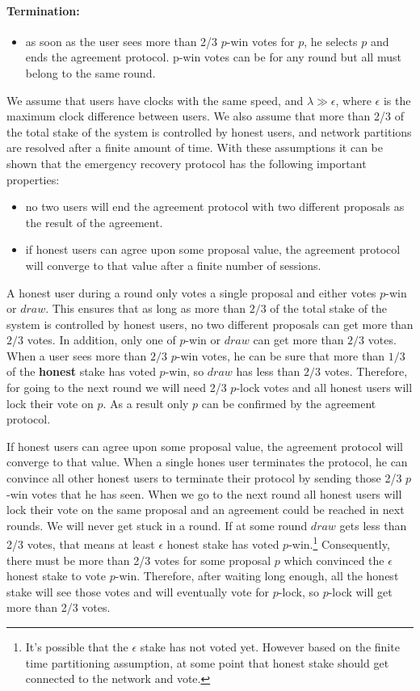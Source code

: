 \paragraph{Termination:}
\begin{itemize}
    \item as soon as the user sees more than 2/3 $p$-win votes for $p$, he selects $p$ and ends
    the agreement protocol. p-win votes can be for any round but all must belong to the same round.
\end{itemize}


We assume that users have clocks with the same speed, and $\lambda \gg \epsilon$, where $\epsilon$ is the maximum
clock difference between users. We also assume that more than 2/3 of the total stake of the system is controlled
by honest users, and network partitions are resolved after a finite amount of time. With these assumptions it can be
shown that the emergency recovery protocol has the following important properties:
\begin{itemize}
    \item no two users will end the agreement protocol with two different proposals as the result of the agreement.
    \item if honest users can agree upon some proposal value, the agreement protocol will converge to that value
    after a finite number of sessions.
\end{itemize}

A honest user during a round only votes a single proposal and either votes $p$-win or $draw$. This ensures that
as long as more than $2/3$ of the total stake of the system is controlled by honest users, no two different proposals
can get more than $2/3$ votes. In addition, only one of $p$-win or $draw$ can get more than $2/3$ votes. When a
user sees more than $2/3$ $p$-win votes, he can be sure that more than $1/3$ of the \textbf{honest}
stake has voted $p$-win, so $draw$ has less than $2/3$ votes. Therefore, for going to the next round we
will need 2/3 $p$-lock votes and all honest users will lock their vote on $p$. As a result only $p$ can be confirmed by
the agreement protocol.

If honest users can agree upon some proposal value, the agreement protocol will converge to that value. When a
single hones user terminates the protocol, he can convince all other honest users to terminate their protocol by
sending those 2/3 $p$-win votes that he has seen. When we go to the next round all honest users will lock their vote on
the same proposal and an agreement could be reached in next rounds. We will never get stuck in a round. If at some
round $draw$ gets less than 2/3 votes, that means at least $\epsilon$ honest stake has voted
$p$-win.\footnote{It's possible that the $\epsilon$ stake has not voted yet. However based on the finite time
partitioning assumption, at some point that honest stake should get connected to the network and vote.}
Consequently, there must be more than 2/3 votes for some proposal $p$ which convinced the $\epsilon$ honest stake to
vote $p$-win. Therefore, after waiting long enough, all the honest stake will see those votes and will eventually
vote for $p$-lock, so $p$-lock will get more than 2/3 votes.

